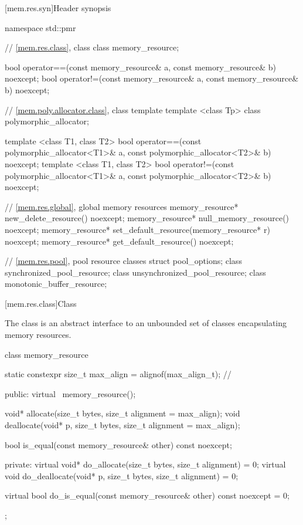 [mem.res.syn]{Header  synopsis}

%
%
\begin{codeblock}
namespace std::pmr {
  // \ref{mem.res.class}, class 
  class memory_resource;

  bool operator==(const memory_resource& a, const memory_resource& b) noexcept;
  bool operator!=(const memory_resource& a, const memory_resource& b) noexcept;

  // \ref{mem.poly.allocator.class}, class template 
  template <class Tp> class polymorphic_allocator;

  template <class T1, class T2>
    bool operator==(const polymorphic_allocator<T1>& a,
                    const polymorphic_allocator<T2>& b) noexcept;
  template <class T1, class T2>
    bool operator!=(const polymorphic_allocator<T1>& a,
                    const polymorphic_allocator<T2>& b) noexcept;

  // \ref{mem.res.global}, global memory resources
  memory_resource* new_delete_resource() noexcept;
  memory_resource* null_memory_resource() noexcept;
  memory_resource* set_default_resource(memory_resource* r) noexcept;
  memory_resource* get_default_resource() noexcept;

  // \ref{mem.res.pool}, pool resource classes
  struct pool_options;
  class synchronized_pool_resource;
  class unsynchronized_pool_resource;
  class monotonic_buffer_resource;
}
\end{codeblock}

[mem.res.class]{Class }

\pnum
The  class is an abstract interface to an unbounded set of classes encapsulating memory resources.

%
\begin{codeblock}
class memory_resource {
  static constexpr size_t max_align = alignof(max_align_t); // \expos

public:
  virtual ~memory_resource();

  void* allocate(size_t bytes, size_t alignment = max_align);
  void deallocate(void* p, size_t bytes, size_t alignment = max_align);

  bool is_equal(const memory_resource& other) const noexcept;

private:
  virtual void* do_allocate(size_t bytes, size_t alignment) = 0;
  virtual void do_deallocate(void* p, size_t bytes, size_t alignment) = 0;

  virtual bool do_is_equal(const memory_resource& other) const noexcept = 0;
};
\end{codeblock}


